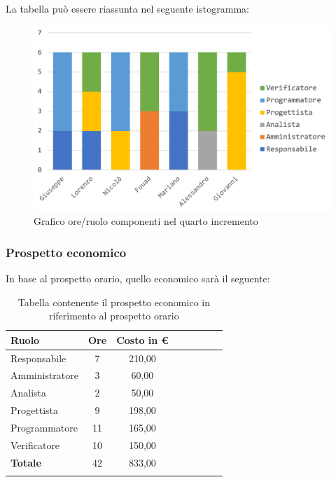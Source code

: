 		La tabella può essere riassunta nel seguente istogramma:
		\begin{figure}[H]
			\centering
			\includegraphics[width=0.8\linewidth]{./images/preventivo/incremento4-1.png}
			\caption{Grafico ore/ruolo componenti nel quarto  incremento}
			\label{fig:grafico suddivione ruoli incremento IV}
		\end{figure}
		
		\subsubsection{Prospetto economico}
		In base al prospetto orario, quello economico sarà il seguente: 
		
		\begin{longtable}{|l|c|c|c|c|c|c|c|}
			\hline
			\rowcolor{lighter-grayer}
			\textbf{Ruolo} & \textbf{Ore} & \textbf{Costo in € } \\
			\hline
			\endfirsthead
			
			\hline
			Responsabile 	    & 7 & 210,00\\
			\hline 
			\hline
			Amministratore	   & 3 & 60,00\\
			\hline
			\hline
			Analista 				& 2 & 50,00\\
			\hline
			\hline
			Progettista 		   & 9 & 198,00\\
			\hline
			\hline
			Programmatore 	  & 11 & 165,00\\
			\hline
			\hline
			Verificatore 		   & 10 & 150,00\\
			\hline
			\textbf{Totale} 	 & 42 & 833,00\\
			\hline
			\caption{Tabella contenente il prospetto economico in riferimento al prospetto orario}
		\end{longtable}
		\pagebreak
		
